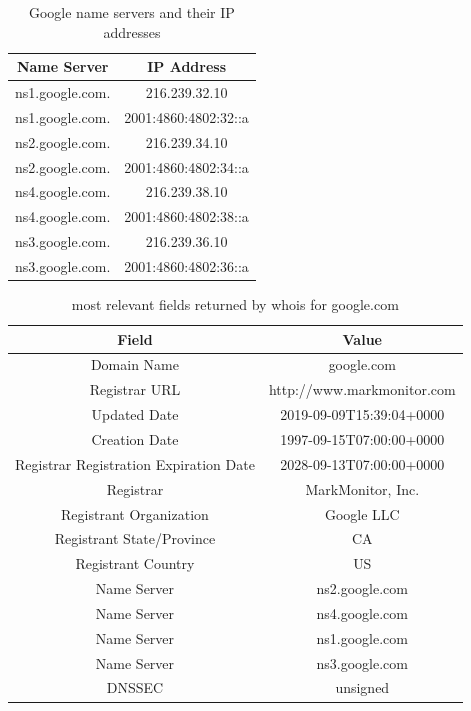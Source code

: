 \documentclass[eng]{class}
\begin{document}
\begin{table}[H]
  \centering
  \footnotesize
  \begin{tabular}{|c|c|}
    \hline
    \linewidth=0cm
    Name Server     & IP Address           \\
    \hline
    ns1.google.com. & 216.239.32.10        \\
    ns1.google.com. & 2001:4860:4802:32::a \\
    ns2.google.com. & 216.239.34.10        \\
    ns2.google.com. & 2001:4860:4802:34::a \\
    ns4.google.com. & 216.239.38.10        \\
    ns4.google.com. & 2001:4860:4802:38::a \\
    ns3.google.com. & 216.239.36.10        \\
    ns3.google.com. & 2001:4860:4802:36::a \\
    \hline
  \end{tabular}
  \caption{Google name servers and their IP addresses}
  \label{tab-5}
\end{table}

\begin{table}[H]
  \centering
  \tiny
  \begin{tabular}{|c|c|}
    \hline
    \linewidth=0cm
    Field                                  & Value                      \\
    \hline
    Domain Name                            & google.com                 \\
    Registrar URL                          & http://www.markmonitor.com \\
    Updated Date                           & 2019-09-09T15:39:04+0000   \\
    Creation Date                          & 1997-09-15T07:00:00+0000   \\
    Registrar Registration Expiration Date & 2028-09-13T07:00:00+0000   \\
    Registrar                              & MarkMonitor, Inc.          \\
    Registrant Organization                & Google LLC                 \\
    Registrant State/Province              & CA                         \\
    Registrant Country                     & US                         \\
    Name Server                            & ns2.google.com             \\
    Name Server                            & ns4.google.com             \\
    Name Server                            & ns1.google.com             \\
    Name Server                            & ns3.google.com             \\
    DNSSEC                                 & unsigned                   \\
    \hline
  \end{tabular}
  \caption{most relevant fields returned by whois for google.com}
  \label{tab-6}
\end{table}
\end{document}
